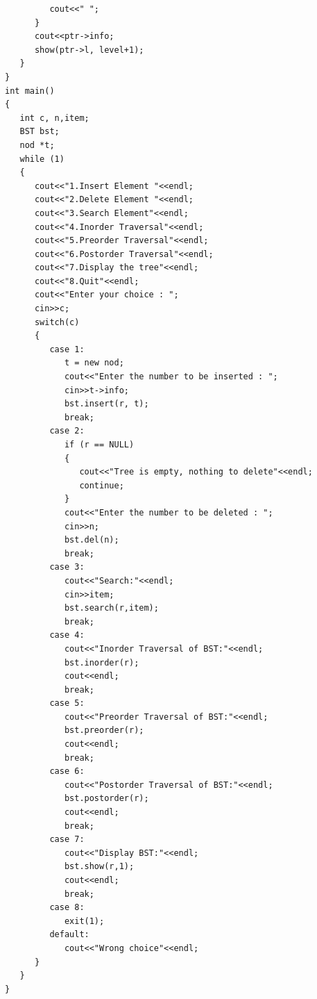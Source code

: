 \documentclass{report}
\begin{document}
\begin{verbatim}
         cout<<" ";
      }
      cout<<ptr->info;
      show(ptr->l, level+1);
   }
}
int main()
{
   int c, n,item;
   BST bst;
   nod *t;
   while (1)
   {
      cout<<"1.Insert Element "<<endl;
      cout<<"2.Delete Element "<<endl;
      cout<<"3.Search Element"<<endl;
      cout<<"4.Inorder Traversal"<<endl;
      cout<<"5.Preorder Traversal"<<endl;
      cout<<"6.Postorder Traversal"<<endl;
      cout<<"7.Display the tree"<<endl;
      cout<<"8.Quit"<<endl;
      cout<<"Enter your choice : ";
      cin>>c;
      switch(c)
      {
         case 1:
            t = new nod;
            cout<<"Enter the number to be inserted : ";
            cin>>t->info;
            bst.insert(r, t);
            break;
         case 2:
            if (r == NULL)
            {
               cout<<"Tree is empty, nothing to delete"<<endl;
               continue;
            }
            cout<<"Enter the number to be deleted : ";
            cin>>n;
            bst.del(n);
            break;
         case 3:
            cout<<"Search:"<<endl;
            cin>>item;
            bst.search(r,item);
            break;
         case 4:
            cout<<"Inorder Traversal of BST:"<<endl;
            bst.inorder(r);
            cout<<endl;
            break;
         case 5:
            cout<<"Preorder Traversal of BST:"<<endl;
            bst.preorder(r);
            cout<<endl;
            break;
         case 6:
            cout<<"Postorder Traversal of BST:"<<endl;
            bst.postorder(r);
            cout<<endl;
            break;
         case 7:
            cout<<"Display BST:"<<endl;
            bst.show(r,1);
            cout<<endl;
            break;
         case 8:
            exit(1);
         default:
            cout<<"Wrong choice"<<endl;
      }
   }
}
\end{verbatim}
\end{document}
